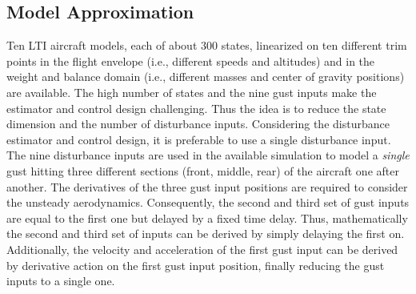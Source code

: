 \documentclass[graybox]{svmult}
\begin{document}
\subsection{Model Approximation}\label{APPsubsec:model}\vspace{-1mm}
Ten LTI aircraft models, each of about 300 states, linearized on ten different trim points in the flight envelope (i.e., different speeds and altitudes) and in the weight and balance domain (i.e., different masses and center of gravity positions) are available.
The high number of states and the nine gust inputs make the estimator and control design challenging. Thus the idea is to reduce the state dimension and the number  of disturbance inputs. Considering the disturbance estimator and control design, it is preferable to use a single disturbance input.
The nine disturbance inputs are used in the available simulation to model a \textit{single} gust hitting  three different sections  (front, middle, rear) of the aircraft one after another. The derivatives of the three gust input positions are required to consider the unsteady aerodynamics. 
Consequently, the second and third set of gust inputs are equal to the first one but delayed by a fixed time delay. Thus, mathematically the second and third set of inputs can be derived by simply delaying the first on. Additionally, the velocity and acceleration of the first gust input can be derived by derivative action on the first gust input position, finally reducing the gust inputs to a single one.
\end{document}
